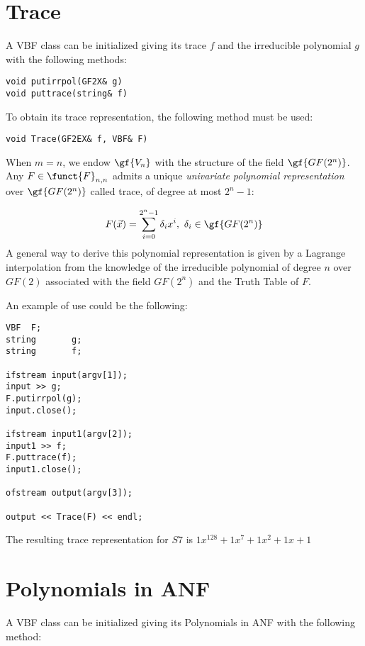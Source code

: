 \section{Trace}

A VBF class can be initialized giving its trace $f$ and the irreducible polynomial $g$ with the following methods:

\begin{verbatim}
void putirrpol(GF2X& g)
void puttrace(string& f)
\end{verbatim}

To obtain its trace representation, the following method must be used:

\begin{verbatim}
void Trace(GF2EX& f, VBF& F)
\end{verbatim}

When $m=n$, we endow $\gf{V_n}$ with the structure of the field $\gf{GF(2^n)}$. Any $F \in \funct{F}_{n,n}$ admits a unique \textsl{univariate polynomial representation} over $\gf{GF(2^n)}$ called trace, of degree at most $2^n-1$:

\begin{equation}
F(\vec{x}) = \sum_{i=0}^{2^n-1} \delta_i x^i, \ \delta_i \in \gf{GF(2^n)}
\end{equation}
A general way to derive this polynomial representation is given by a Lagrange interpolation from the
knowledge of the irreducible polynomial of degree $n$ over $GF(2)$ associated with the field $GF(2^n)$ and the Truth Table of $F$.

An example of use could be the following:
\begin{verbatim}
VBF  F;
string       g;
string       f;

ifstream input(argv[1]);
input >> g;
F.putirrpol(g);
input.close();

ifstream input1(argv[2]);
input1 >> f;
F.puttrace(f);
input1.close();

ofstream output(argv[3]);

output << Trace(F) << endl;
\end{verbatim}

The resulting trace representation for $S7$ is $1x^128+1x^7+1x^2+1x+1$

\section{Polynomials in ANF}

A VBF class can be initialized giving its Polynomials in ANF with the following method:

